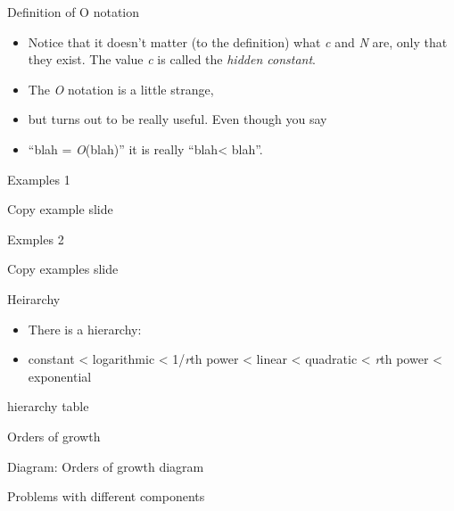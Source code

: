\documentclass{beamer}
\begin{document}
\begin{frame}

Definition of O notation

\begin{itemize}
\item Notice that it doesn't matter (to the definition) what \textit{c }and \textit{N }are, only that they exist. The
value \textit{c }is called the \textit{hidden constant}.
\item The \textit{O }notation is a little strange, 
\item but turns out to be really useful. Even though you say 
\item {}``blah = \textit{O}(blah)'' it is really ``blah{\textless} blah''.
\end{itemize}

\end{frame} \begin{frame}

Examples 1

Copy example slide

\end{frame} \begin{frame} 

Exmples 2

Copy examples slide

\end{frame} \begin{frame}

Heirarchy

\begin{itemize}
\item There is a hierarchy:
\item constant {\textless} logarithmic {\textless} 1/\textit{r}th power {\textless} linear {\textless} quadratic
{\textless} \textit{r}th power {\textless} exponential
\end{itemize}

hierarchy table

\end{frame} \begin{frame}

Orders of growth

Diagram: Orders of growth diagram

\end{frame} \begin{frame}

Problems with different components


\end{frame}
\end{document}

